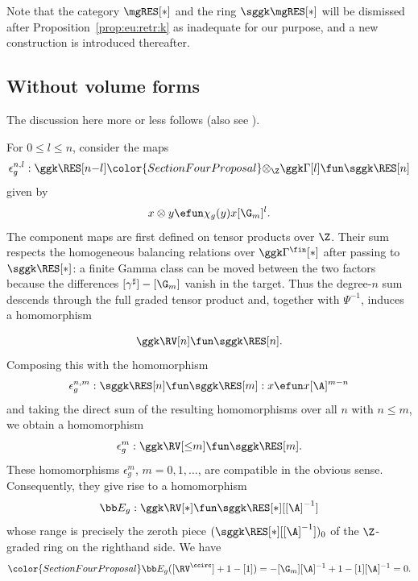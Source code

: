 Note that the category $\mgRES[*]$ and the ring $\sggk \mgRES[*]$  will be dismissed after Proposition~\ref{prop:eu:retr:k} as inadequate for our purpose, and a new construction is introduced thereafter.

\subsection{Without volume forms}\label{subs:uni:retr:novol}

The discussion here more or less follows \cite[\S~2.5]{hru:loe:lef} (also see \cite[Theorem~10.5]{hrushovski:kazhdan:integration:vf}).

For $0 \leq l \leq n$, consider the maps
\[
\epsilon^{n,l}_g : \ggk \RES[n{-}l] {\color{SectionFourProposal}\otimes_{\Z}} \ggk \Gamma[l] \fun \sggk \RES[n]
\]
given by
\begin{equation}\label{kill:gamma}
x \otimes y \efun \chi_g(y) x [\G_m]^l.
\end{equation}
{\color{SectionFourProposal}The component maps are first defined on tensor products over $\Z$. Their sum respects the homogeneous balancing relations over $\ggk\Gamma^{\fin}[*]$ after passing to $\sggk\RES[*]$: a finite Gamma class can be moved between the two factors because the differences $[\gamma^\sharp]-[\G_m]$ vanish in the target. Thus the degree-$n$ sum descends through the full graded tensor product and, together with $\Psi^{-1}$, induces a homomorphism}

\[
\ggk \RV[n] \fun \sggk \RES[n].
\]
Composing this with the homomorphism
\[
\epsilon^{n,m}_g : \sggk \RES[n]  \fun \sggk \RES[m] : x \efun x [\A]^{m-n}
\]
and taking the direct sum of the resulting homomorphisms over all $n$ with $n \leq m$, we obtain a homomorphism
\[
\epsilon^m_g : \ggk \RV[{\leq} m] \fun \sggk \RES[m].
\]
These homomorphisms $\epsilon^m_g$, $m = 0, 1, \ldots$, are compatible in the obvious sense. Consequently, they give rise to a homomorphism
\[
\bb E_g : \ggk \RV[*] \fun \sggk \RES[*][[\A]^{-1}]
\]
whose range is precisely the zeroth piece $(\sggk \RES[*][[\A]^{-1}])_0$ of the $\Z$-graded ring on the righthand side. We have
\begin{equation}\label{eg:isp:van}
{\color{SectionFourProposal}\bb E_g([\RV^{\ccirc}] + 1 - [1]) = - [\G_m][\A]^{-1} + 1 - [1][\A]^{-1} = 0.}
\end{equation}

